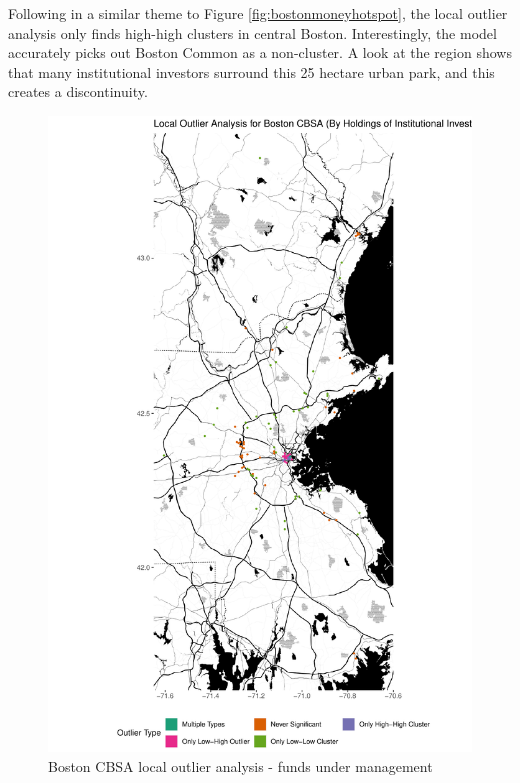 Following in a similar theme to Figure \ref{fig:bostonmoneyhotspot}, the local outlier analysis only finds high-high clusters in central Boston. Interestingly, the model accurately picks out Boston Common as a non-cluster.  A look at the region shows that many institutional investors surround this 25 hectare urban park, and this creates a discontinuity.  

\begin{figure}
	\centering
	\includegraphics[width=1\linewidth]{Figures/ChapterIV/Bos_Money_LO}
	\caption[Boston CBSA Local Outlier Analysis - Funds Under Management 2013-2018]{Boston CBSA local outlier analysis - funds under management}
	\label{fig:bostonlocaloutlier}
\end{figure}


